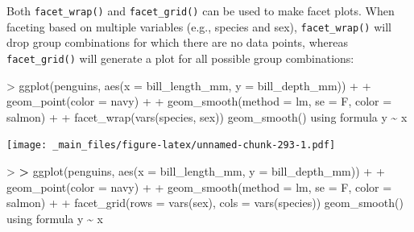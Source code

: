 \documentclass[
]{book}
\newenvironment{Shaded}{\begin{snugshade}}{\end{snugshade}}
\newcommand{\AttributeTok}[1]{\textcolor[rgb]{0.77,0.63,0.00}{#1}}
\newcommand{\ErrorTok}[1]{\textcolor[rgb]{0.64,0.00,0.00}{\textbf{#1}}}
\newcommand{\FunctionTok}[1]{\textcolor[rgb]{0.00,0.00,0.00}{#1}}
\newcommand{\NormalTok}[1]{#1}
\newcommand{\SpecialCharTok}[1]{\textcolor[rgb]{0.00,0.00,0.00}{#1}}
\newcommand{\StringTok}[1]{\textcolor[rgb]{0.31,0.60,0.02}{#1}}
\begin{document}
Both \texttt{facet\_wrap()} and \texttt{facet\_grid()} can be used to make facet plots. When faceting based on multiple variables (e.g., species and sex), \texttt{facet\_wrap()} will drop group combinations for which there are no data points, whereas \texttt{facet\_grid()} will generate a plot for all possible group combinations:

\begin{Shaded}
\begin{Highlighting}[]
\SpecialCharTok{\textgreater{}} \FunctionTok{ggplot}\NormalTok{(penguins, }\FunctionTok{aes}\NormalTok{(}\AttributeTok{x =}\NormalTok{ bill\_length\_mm, }\AttributeTok{y =}\NormalTok{ bill\_depth\_mm)) }\SpecialCharTok{+}
\SpecialCharTok{+}   \FunctionTok{geom\_point}\NormalTok{(}\AttributeTok{color =} \StringTok{\textquotesingle{}navy\textquotesingle{}}\NormalTok{) }\SpecialCharTok{+}
\SpecialCharTok{+}   \FunctionTok{geom\_smooth}\NormalTok{(}\AttributeTok{method =} \StringTok{\textquotesingle{}lm\textquotesingle{}}\NormalTok{, }\AttributeTok{se =}\NormalTok{ F, }\AttributeTok{color =} \StringTok{\textquotesingle{}salmon\textquotesingle{}}\NormalTok{) }\SpecialCharTok{+}
\SpecialCharTok{+}   \FunctionTok{facet\_wrap}\NormalTok{(}\FunctionTok{vars}\NormalTok{(species, sex))}
\StringTok{\textasciigrave{}}\AttributeTok{geom\_smooth()}\StringTok{\textasciigrave{}}\NormalTok{ using formula }\StringTok{\textquotesingle{}y \textasciitilde{} x\textquotesingle{}}
\end{Highlighting}
\end{Shaded}

\texttt{[image: \_main\_files/figure-latex/unnamed-chunk-293-1.pdf]}

\begin{Shaded}
\begin{Highlighting}[]
\SpecialCharTok{\textgreater{}} 
\ErrorTok{\textgreater{}} \FunctionTok{ggplot}\NormalTok{(penguins, }\FunctionTok{aes}\NormalTok{(}\AttributeTok{x =}\NormalTok{ bill\_length\_mm, }\AttributeTok{y =}\NormalTok{ bill\_depth\_mm)) }\SpecialCharTok{+}
\SpecialCharTok{+}   \FunctionTok{geom\_point}\NormalTok{(}\AttributeTok{color =} \StringTok{\textquotesingle{}navy\textquotesingle{}}\NormalTok{) }\SpecialCharTok{+}
\SpecialCharTok{+}   \FunctionTok{geom\_smooth}\NormalTok{(}\AttributeTok{method =} \StringTok{\textquotesingle{}lm\textquotesingle{}}\NormalTok{, }\AttributeTok{se =}\NormalTok{ F, }\AttributeTok{color =} \StringTok{\textquotesingle{}salmon\textquotesingle{}}\NormalTok{) }\SpecialCharTok{+}
\SpecialCharTok{+}   \FunctionTok{facet\_grid}\NormalTok{(}\AttributeTok{rows =} \FunctionTok{vars}\NormalTok{(sex), }\AttributeTok{cols =} \FunctionTok{vars}\NormalTok{(species)) }
\StringTok{\textasciigrave{}}\AttributeTok{geom\_smooth()}\StringTok{\textasciigrave{}}\NormalTok{ using formula }\StringTok{\textquotesingle{}y \textasciitilde{} x\textquotesingle{}}
\end{Highlighting}
\end{Shaded}
\end{document}
